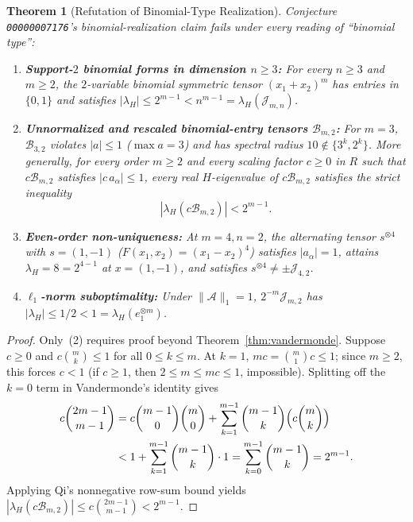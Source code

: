 \documentclass[11pt]{article}
\newtheorem{theorem}{Theorem}[section]
\theoremstyle{definition}
\newcommand{\cA}{\mathcal{A}}
\newcommand{\cB}{\mathcal{B}}
\newcommand{\cJ}{\mathcal{J}}
\begin{document}
\begin{theorem}[Refutation of Binomial-Type Realization]\label{thm:refute-binom}
Conjecture \texttt{00000007176}'s binomial-realization claim fails under every reading of
``binomial type'':
\begin{enumerate}
  \item \textbf{Support-$2$ binomial forms in dimension $n \ge 3$:} For every $n \ge 3$ and
  $m \ge 2$, the $2$-variable binomial symmetric tensor $(x_1 + x_2)^m$ has entries in $\{0, 1\}$
  and satisfies $|\lambda_H| \le 2^{m-1} < n^{m-1} = \lambda_H(\cJ_{m,n})$.
  \item \textbf{Unnormalized and rescaled binomial-entry tensors $\cB_{m,2}$:} For $m = 3$,
  $\cB_{3,2}$ violates $|a| \le 1$ ($\max a = 3$) and has spectral radius $10 \notin \{3^k, 2^k\}$.
  More generally, for \emph{every} order $m \ge 2$ and \emph{every} scaling factor $c \ge 0$ in
  $R$ such that $c \cB_{m,2}$ satisfies $|c\, a_\alpha| \le 1$, every real $H$-eigenvalue of
  $c \cB_{m,2}$ satisfies the strict inequality
  \[
    |\lambda_H(c \cB_{m,2})| < 2^{m-1}.
  \]
  \item \textbf{Even-order non-uniqueness:} At $m = 4, n = 2$, the alternating tensor
  $s^{\otimes 4}$ with $s = (1, -1)$ ($F(x_1, x_2) = (x_1 - x_2)^4$) satisfies $|a_\alpha| = 1$,
  attains $\lambda_H = 8 = 2^{4-1}$ at $x = (1, -1)$, and satisfies $s^{\otimes 4} \ne \pm \cJ_{4,2}$.
  \item \textbf{$\ell_1$-norm suboptimality:} Under $\|\cA\|_1 = 1$, $2^{-m}\cJ_{m,2}$ has
  $|\lambda_H| \le 1/2 < 1 = \lambda_H(e_1^{\otimes m})$.
\end{enumerate}
\end{theorem}

\begin{proof}
Only~(2) requires proof beyond Theorem~\ref{thm:vandermonde}. Suppose $c \ge 0$ and
$c \binom{m}{k} \le 1$ for all $0 \le k \le m$. At $k = 1$, $m c = \binom{m}{1} c \le 1$; since
$m \ge 2$, this forces $c < 1$ (if $c \ge 1$, then $2 \le m \le m c \le 1$, impossible).
Splitting off the $k = 0$ term in Vandermonde's identity gives
\begin{align*}
  c \binom{2m-1}{m-1}
  &= c \binom{m-1}{0}\binom{m}{0} + \sum_{k=1}^{m-1} \binom{m-1}{k}\Bigl(c \binom{m}{k}\Bigr) \\
  &< 1 + \sum_{k=1}^{m-1} \binom{m-1}{k} \cdot 1
   = \sum_{k=0}^{m-1} \binom{m-1}{k} = 2^{m-1}.
\end{align*}
Applying Qi's nonnegative row-sum bound yields $|\lambda_H(c \cB_{m,2})| \le c \binom{2m-1}{m-1} < 2^{m-1}$.
\end{proof}
\end{document}
